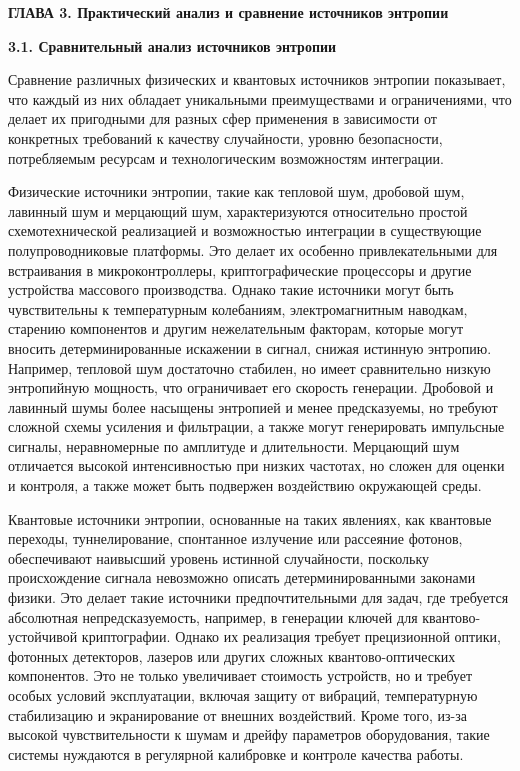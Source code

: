 \clearpage
\textbf{ГЛАВА 3. Практический анализ и сравнение источников энтропии}

\textbf{3.1. Сравнительный анализ источников энтропии}

Сравнение различных физических и квантовых источников энтропии
показывает, что каждый из них обладает уникальными преимуществами и
ограничениями, что делает их пригодными для разных сфер применения в
зависимости от конкретных требований к качеству случайности, уровню
безопасности, потребляемым ресурсам и технологическим возможностям
интеграции.

Физические источники энтропии, такие как тепловой шум, дробовой шум,
лавинный шум и мерцающий шум, характеризуются относительно простой
схемотехнической реализацией и возможностью интеграции в существующие
полупроводниковые платформы. Это делает их особенно привлекательными для
встраивания в микроконтроллеры, криптографические процессоры и другие
устройства массового производства. Однако такие источники могут быть
чувствительны к температурным колебаниям, электромагнитным наводкам,
старению компонентов и другим нежелательным факторам, которые могут
вносить детерминированные искажении в сигнал, снижая истинную энтропию.
Например, тепловой шум достаточно стабилен, но имеет сравнительно низкую
энтропийную мощность, что ограничивает его скорость генерации. Дробовой
и лавинный шумы более насыщены энтропией и менее предсказуемы, но
требуют сложной схемы усиления и фильтрации, а также могут генерировать
импульсные сигналы, неравномерные по амплитуде и длительности. Мерцающий
шум отличается высокой интенсивностью при низких частотах, но сложен для
оценки и контроля, а также может быть подвержен воздействию окружающей
среды.

Квантовые источники энтропии, основанные на таких явлениях, как
квантовые переходы, туннелирование, спонтанное излучение или рассеяние
фотонов, обеспечивают наивысший уровень истинной случайности, поскольку
происхождение сигнала невозможно описать детерминированными законами
физики. Это делает такие источники предпочтительными для задач, где
требуется абсолютная непредсказуемость, например, в генерации ключей для
квантово-устойчивой криптографии. Однако их реализация требует
прецизионной оптики, фотонных детекторов, лазеров или других сложных
квантово-оптических компонентов. Это не только увеличивает стоимость
устройств, но и требует особых условий эксплуатации, включая защиту от
вибраций, температурную стабилизацию и экранирование от внешних
воздействий. Кроме того, из-за высокой чувствительности к шумам и дрейфу
параметров оборудования, такие системы нуждаются в регулярной калибровке
и контроле качества работы.

